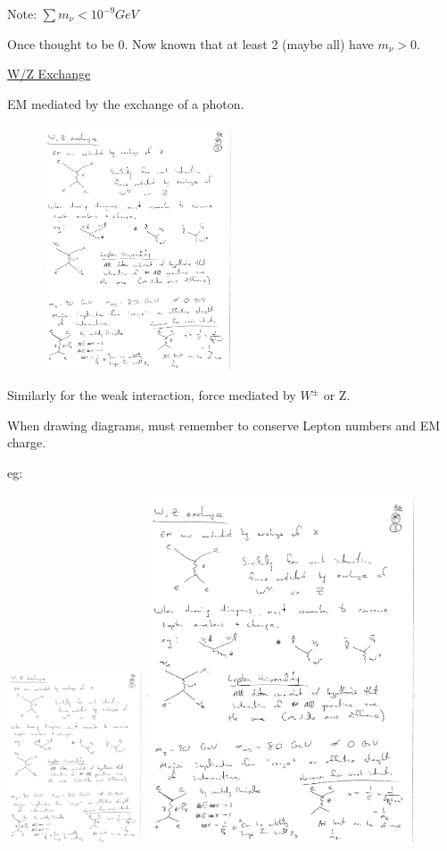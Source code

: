{Note: $\sum m_\nu < 10^{-9} GeV$

Once thought to be 0.  Now known that at least 2 (maybe all) have $m_\nu > 0$.

\clearpage

\underline{W/Z Exchange}

EM mediated by the exchange of a photon.

\begin{figure}[h]
\includegraphics[width=0.5\textwidth]{./PhotonExchange.pdf}
\end{figure}


Similarly for the weak interaction, force mediated by $W^{\pm}$ or Z.

When drawing diagrams, must remember to conserve Lepton numbers and EM charge.

eg: 

\includegraphics[width=0.3\textwidth]{./ZVertex.pdf}   
\includegraphics[width=0.6\textwidth]{./WVertex.pdf}   

}
